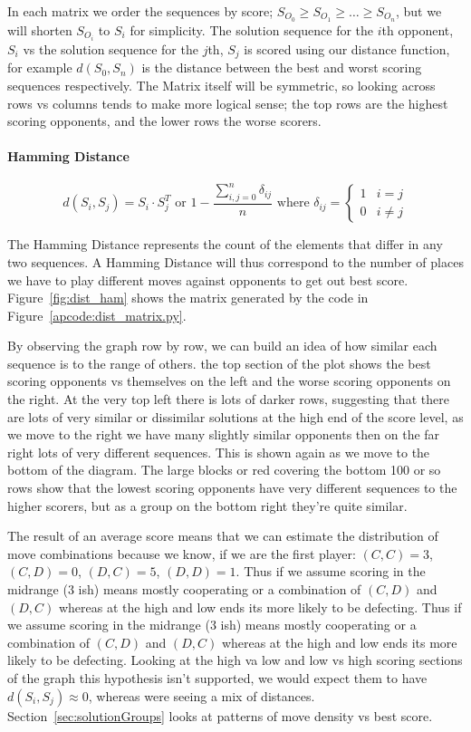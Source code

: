 In each matrix we order the sequences by score; $S_{O_0}\ge S_{O_1} \ge \ldots \ge S_{O_n}$, but we will shorten $S_{O_i}$ to $S_{i}$ for simplicity.
The solution sequence for the $i$th opponent, $S_i$ vs the solution sequence for the $j$th, $S_j$ is scored using our distance function, for example $d(S_0,S_n)$ is the distance between the best and worst scoring sequences respectively.
The Matrix itself will be symmetric, so looking across rows vs columns tends to make more logical sense; the top rows are the highest scoring opponents, and the lower rows the worse scorers.

\paragraph{Hamming Distance}
$$d(S_i,S_j) = S_i \cdot S_j^T \text{ or } 1-\frac{\sum^n_{i,j=0}\delta_{ij}}{n}\text{ where } \delta_{ij} = \begin{cases} 
    1 & i=j \\
    0 & i\ne j 
\end{cases} $$

The Hamming Distance represents the count of the elements that differ in any two sequences. 
A Hamming Distance will thus correspond to the number of places we have to play different moves against opponents to get out best score. 
Figure~\ref{fig:dist_ham} shows the matrix generated by the code in Figure~\ref{apcode:dist_matrix.py}.

By observing the graph row by row, we can build an idea of how similar each sequence is to the range of others.
the top section of the plot shows the best scoring opponents vs themselves on the left and the worse scoring opponents on the right. 
At the very top  left there is lots of darker rows, suggesting that there are lots of very similar or dissimilar solutions at the high end of the score level, as we move to the right we have many slightly similar opponents then on the far right lots of very different sequences.
This is shown again as we move to the bottom of the diagram.
The large blocks or red covering the bottom  100 or so rows show that the lowest scoring opponents have very different sequences to the higher scorers, but as a group on the bottom right they're quite similar.

The result of an average score means that we can estimate the distribution of move combinations because we know, if we are the first player: $(C,C)=3$, $(C,D)=0$, $(D,C)=5$, $(D,D)=1$.
Thus if we assume scoring in the midrange ($3$ ish) means mostly cooperating or a combination of $(C,D)$ and $(D,C)$ whereas at the high and low ends its more likely to be defecting.
Thus if we assume scoring in the midrange ($3$ ish) means mostly cooperating or a combination of $(C,D)$ and $(D,C)$ whereas at the high and low ends its more likely to be defecting.
Looking at the high va low and low vs high scoring sections of the graph this hypothesis isn't supported, we would expect them to have $d(S_i,S_j)\approx 0$, whereas were seeing a mix of distances. 
Section~\ref{sec:solutionGroups} looks at patterns of move density vs best score.

